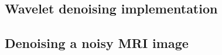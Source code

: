 \subsection{Wavelet denoising implementation}


\subsection{Denoising a noisy MRI image}


\clearpage
